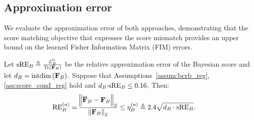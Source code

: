 \subsection{Approximation error}
{We evaluate the approximation error of both approaches, demonstrating that the %
}
score matching objective {that expresses the score mismatch} provides an upper bound on the {learned} Fisher Information Matrix (FIM) errors.
\begin{theorem}\label{thm:lrn:direct}
    Let $\mathrm{sRE}_B\triangleq\frac{{\mathcal{L}_{B}^{0}}}{\mathrm{Tr}\left(\mathbf{F}_{B}\right)}$ be the %
    {relative %
    {approximation error} of the} Bayesian score 
    {and let ${{d}_B}=\mathrm{intdim}\left(\mathbf{F}_B\right)$.} Suppose that Assumptions~\ref{assum:bcrb_reg}, \ref{ass:score_cond_reg} hold and ${{d}_B}{\cdot \mathrm{sRE}_B}\leq {0.16}$. Then:
    \begin{align}\label{eq:error_learn_post_approch}
        {\mathrm{RE}_{B}^{(a)}}=\frac{\norm{\overline{\mathbf{F}}_{B}-\mathbf{F}_{B}}_2}{\norm{\mathbf{F}_{B}}_2} &\leq\eta_{B}^{(a)} \triangleq {2.4}\sqrt{{{d}_B}\cdot\mathrm{sRE}_B}.
    \end{align}
\end{theorem}

